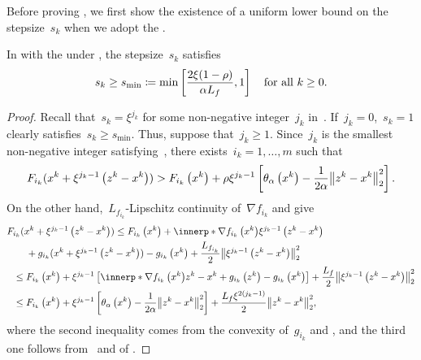 \documentclass[../../main]{subfiles}
\begin{document}
Before proving , we first show the existence of a uniform lower bound on the stepsize~$s_k$ when we adopt the .
\begin{lemma} 
    In  with the  under , the stepsize~$s_k$ satisfies
    \begin{equation}
        s_k \ge s_{\min} \coloneqq \min \left[\frac{2 \xi (1 - \rho)}{\alpha L_f}, 1\right] \quad \text{for all~$k \ge 0$}
    .\end{equation} 
\end{lemma}
\begin{proof}
    Recall that~$s_k = \xi^{j_k}$ for some non-negative integer~$j_k$ in~.
    If~$j_k = 0$,~$s_k = 1$ clearly satisfies~$s_k \ge s_{\min}$.
    Thus, suppose that~$j_k \ge 1$.
    Since~$j_k$ is the smallest non-negative integer satisfying~, there exists~$i_k = 1, \dots, m$ such that
    \begin{equation}
        F_{i_k}(x^k + \xi^{j_k - 1} \left(z^k - x^k\right)) > F_{i_k}\left(x^k\right) + \rho \xi^{j_k - 1} \left[ \theta_\alpha\left(x^k\right) - \frac{1}{2\alpha} \norm*{z^k - x^k}_2^2 \right]
    .\end{equation} 
    On the other hand,~$L_{f_{i_k}}$-Lipschitz continuity of~$\nabla f_{i_k}$ and  give
    \begin{align}
        \MoveEqLeft F_{i_k}(x^k + \xi^{j_k - 1} \left(z^k - x^k\right)) \le F_{i_k}\left(x^k\right) + \innerp*{\nabla f_{i_k}\left(x^k\right)}{\xi^{j_k - 1} \left(z^k - x^k\right)} \\
        &+ g_{i_k}(x^k + \xi^{j_k - 1} \left(z^k - x^k\right)) - g_{i_k}\left(x^k\right) + \frac{L_{f_{i_k}}}{2} \norm*{\xi^{j_k - 1} \left(z^k - x^k\right)}_2^2 \\
        \le{}& F_{i_k}\left(x^k\right) + \xi^{j_k - 1} \left[ \innerp*{\nabla f_{i_k}\left(x^k\right)}{z^k - x^k} + g_{i_k}\left(z^k\right) - g_{i_k}\left(x^k\right) \right] + \frac{L_f}{2} \norm*{\xi^{j_k - 1} \left(z^k - x^k\right)}_2^2 \\
    \le{}& F_{i_k}\left(x^k\right) + \xi^{j_k - 1} \left[ \theta_\alpha\left(x^k\right) - \frac{1}{2 \alpha} \norm*{z^k - x^k}_2^2 \right] + \frac{L_f \xi^{2 (j_k - 1)}}{2} \norm*{z^k - x^k}_2^2
    ,\end{align}
    where the second inequality comes from the convexity of~$g_{i_k}$ and , and the third one follows from~ and  of .

\end{proof}
\end{document}
